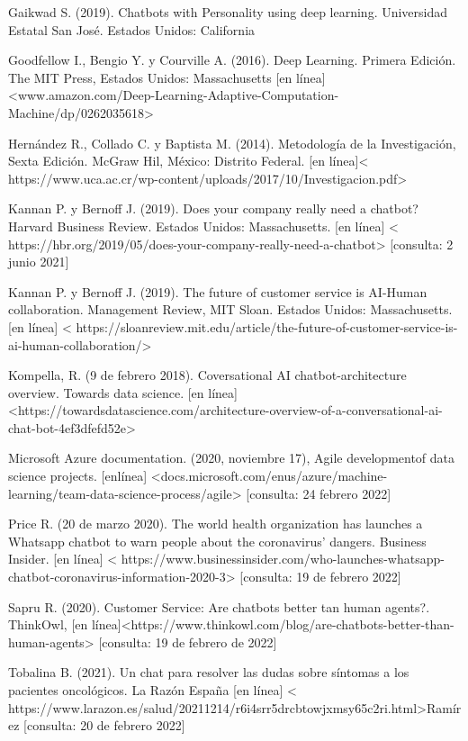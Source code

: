 \documentclass[letter, openright, 12pt]{book}
\begin{document}
{\begin{hangparas}{.35in}{1}
Gaikwad S. (2019). Chatbots with Personality using deep learning. Universidad Estatal San José. Estados Unidos: California

Goodfellow I., Bengio Y. y Courville A. (2016). Deep Learning. Primera Edición. The MIT Press, Estados Unidos: Massachusetts [en línea] <www.amazon.com/Deep-Learning-Adaptive-Computation-Machine/dp/0262035618>

Hernández R., Collado C. y Baptista M. (2014). Metodología de la Investigación, Sexta Edición. McGraw Hil, México: Distrito Federal. [en línea]< https://www.uca.ac.cr/wp-content/uploads/2017/10/Investigacion.pdf>

Kannan P. y Bernoff J. (2019). Does your company really need a chatbot? Harvard Business Review.  Estados Unidos: Massachusetts. [en línea] < https://hbr.org/2019/05/does-your-company-really-need-a-chatbot> [consulta: 2 junio 2021]

Kannan P. y Bernoff J. (2019). The future of customer service is AI-Human collaboration. Management Review, MIT Sloan. Estados Unidos: Massachusetts. [en línea] < https://sloanreview.mit.edu/article/the-future-of-customer-service-is-ai-human-collaboration/>

Kompella, R. (9 de febrero 2018). Coversational AI chatbot-architecture overview. Towards data science. [en línea] <https://towardsdatascience.com/architecture-overview-of-a-conversational-ai-chat-bot-4ef3dfefd52e>

Microsoft Azure documentation. (2020, noviembre 17), Agile developmentof data science projects. [enlínea] <docs.microsoft.com/enus/azure/machine-learning/team-data-science-process/agile> [consulta: 24 febrero 2022]

Price R. (20 de marzo 2020). The world health organization has launches a Whatsapp chatbot to warn people about the coronavirus’ dangers. Business Insider. [en línea] < https://www.businessinsider.com/who-launches-whatsapp-chatbot-coronavirus-information-2020-3> [consulta: 19 de febrero 2022]

Sapru R. (2020). Customer Service: Are chatbots better tan human agents?. ThinkOwl, [en línea]<https://www.thinkowl.com/blog/are-chatbots-better-than-human-agents> [consulta: 19 de febrero de 2022]

Tobalina B. (2021). Un chat para resolver las dudas sobre síntomas a los pacientes oncológicos. La Razón España [en línea] < https://www.larazon.es/salud/20211214/r6i4srr5drcbtowjxmsy65c2ri.html>Ramírez [consulta: 20 de febrero 2022]



\end{hangparas}}
\end{document}
